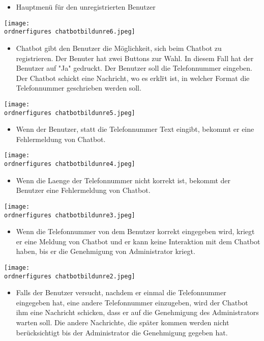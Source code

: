 \begin{itemize}
	\item Hauptmen\"u f\"ur den unregistrierten Benutzer
\end{itemize}
\captionsetup{type=figure}
\texttt{[image: \\ordnerfigures chatbotbildunre6.jpeg]}
\caption{Hauptmen\"u f\"ur den unregistrierten Benutzer}
\label{fig:chaftboregistr}
\begin{itemize}
	\item Chatbot gibt den Benutzer die Möglichkeit, sich beim Chatbot zu registrieren. Der Benuter hat zwei Buttons zur Wahl. In diesem Fall hat der Benutzer auf "Ja" gedruckt. Der Benutzer soll die Telefonnummer eingeben. Der Chatbot schickt eine Nachricht, wo es erkl\"rt ist, in welcher Format die Telefonnummer geschrieben werden soll.
\end{itemize}
\captionsetup{type=figure}
\texttt{[image: \\ordnerfigures chatbotbildunre5.jpeg]}
\caption{Registrierung beim Chatbot}
\label{fig:chfdsatboregistr}
\begin{itemize}
	\item Wenn der Benutzer, statt die Telefonnummer Text eingibt, bekommt er eine Fehlermeldung von Chatbot.
\end{itemize}
\captionsetup{type=figure}
\texttt{[image: \\ordnerfigures chatbotbildunre4.jpeg]}
\caption{Falsche Eingabe des Telefonnummers}
\label{fig:chfdsatboregistrfds}
\begin{itemize}
	\item Wenn die Laenge der Telefonnummer nicht korrekt ist, bekommt der Benutzer eine Fehlermeldung von Chatbot.
\end{itemize}
\captionsetup{type=figure}
\texttt{[image: \\ordnerfigures chatbotbildunre3.jpeg]}
\caption{Telefonnummer zu kurz}
\label{fig:crboregistrfds}
\begin{itemize}
	\item Wenn die Telefonnummer von dem Benutzer korrekt eingegeben wird, kriegt er eine Meldung von Chatbot und er kann keine Interaktion mit dem Chatbot haben, bis er die Genehmigung von Administrator kriegt.
\end{itemize}
\captionsetup{type=figure}
\texttt{[image: \\ordnerfigures chatbotbildunre2.jpeg]}
\caption{Korrekte Eingabe des Telefonnummers}
\label{fig:crboreistrfds}
\begin{itemize}
	\item Falls der Benutzer versucht, nachdem er einmal die Telefonnummer eingegeben hat, eine andere Telefonnummer einzugeben, wird der Chatbot ihm eine Nachricht schicken, dass er auf die Genehmigung des Administrators warten soll. Die andere Nachrichte, die später kommen werden nicht berücksichtigt bis der Administrator die Genehmigung gegeben hat.
\end{itemize}
